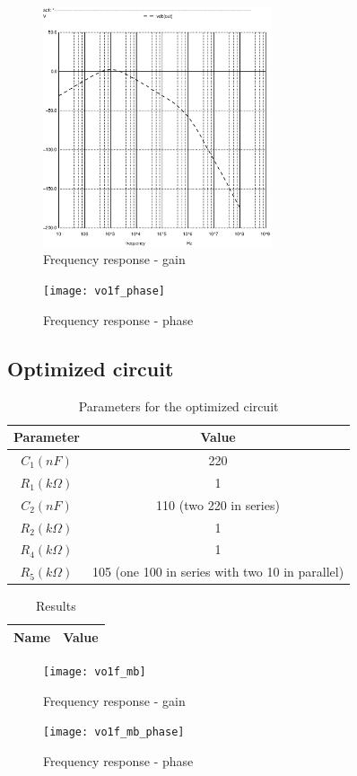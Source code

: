 \begin{figure}[H]
\centering
\includegraphics[width=0.6\textwidth]{vo1f}
\caption{Frequency response - gain}
\end{figure}

\begin{figure}[H]
\centering
\texttt{[image: vo1f\_phase]}
\caption{Frequency response - phase}
\end{figure}

\subsection{Optimized circuit}

\begin{table}[H]
\centering
\begin{tabular}{|c|c|}
        \hline
        Parameter & Value \\
        \hline
        $C_1 (nF)$ & 220 \\
        $R_1 (k\Omega)$ & 1 \\
        $C_2 (nF)$ & 110 (two 220 in series) \\
        $R_2 (k\Omega)$ & 1 \\
        $R_4 (k\Omega)$ & 1 \\
        $R_5 (k\Omega)$ & 105 (one 100 in series with two 10 in parallel) \\
        \hline
\end{tabular}
\caption{Parameters for the optimized circuit}
\label{optimized_par}
\end{table}

\begin{table}[H]
  \centering
  \begin{tabular}{|c|c|}
    \hline
        {\bf Name} & {\bf Value} \\
        \hline
        \hline
        
        \hline
  \end{tabular}
  \caption{Results}
  \label{sim_mb_results}
\end{table}

\begin{figure}[H]
\centering
\texttt{[image: vo1f\_mb]}
\caption{Frequency response - gain}
\end{figure}

\begin{figure}[H]
\centering
\texttt{[image: vo1f\_mb\_phase]}
\caption{Frequency response - phase}
\end{figure}
